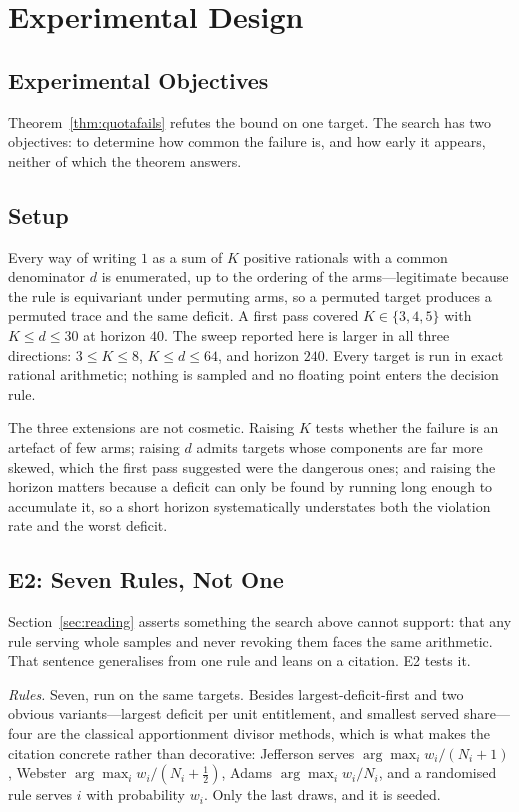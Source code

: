 \section{Experimental Design}
\label{sec:expdesign}

\subsection{Experimental Objectives}

Theorem~\ref{thm:quotafails} refutes the bound on one target. The search has two objectives:
to determine how common the failure is, and how early it appears, neither of which the theorem
answers.

\subsection{Setup}

Every way of writing $1$ as a sum of $K$ positive rationals with a common denominator $d$ is
enumerated, up to the ordering of the arms---legitimate because the rule is equivariant under
permuting arms, so a permuted target produces a permuted trace and the same deficit. A first
pass covered $K\in\{3,4,5\}$ with $K\le d\le30$ at horizon $40$. The sweep reported here is
larger in all three directions: $3\le K\le8$, $K\le d\le64$, and horizon $240$. Every target
is run in exact rational arithmetic; nothing is sampled and no floating point enters the
decision rule.

The three extensions are not cosmetic. Raising $K$ tests whether the failure is an artefact of
few arms; raising $d$ admits targets whose components are far more skewed, which the first
pass suggested were the dangerous ones; and raising the horizon matters because a deficit can
only be found by running long enough to accumulate it, so a short horizon systematically
understates both the violation rate and the worst deficit.

\subsection{E2: Seven Rules, Not One}
\label{sec:e2}

Section~\ref{sec:reading} asserts something the search above cannot support: that any rule
serving whole samples and never revoking them faces the same arithmetic. That sentence
generalises from one rule and leans on a citation. E2 tests it.

\emph{Rules.} Seven, run on the same targets. Besides largest-deficit-first and two obvious
variants---largest deficit per unit entitlement, and smallest served share---four are the
classical apportionment divisor methods, which is what makes the citation concrete rather
than decorative: Jefferson serves $\arg\max_{i} w_{i}/(N_{i}+1)$, Webster
$\arg\max_{i} w_{i}/(N_{i}+\tfrac12)$, Adams $\arg\max_{i} w_{i}/N_{i}$, and a randomised
rule serves $i$ with probability $w_{i}$. Only the last draws, and it is seeded.

